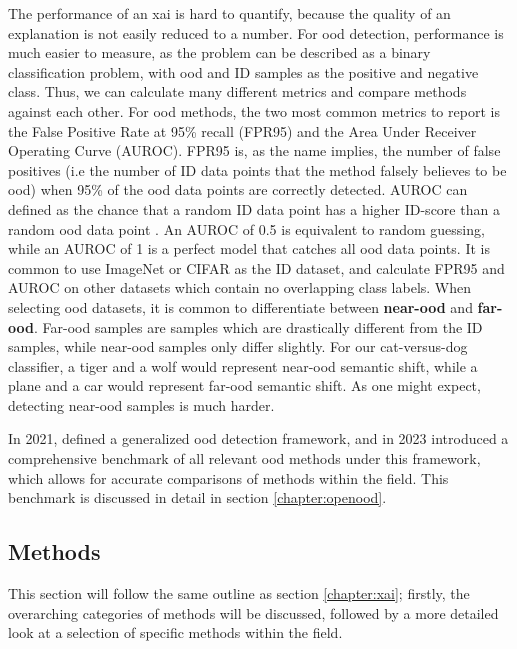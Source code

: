 \documentclass[UKenglish]{uiomasterthesis} %
\theoremstyle{definition}
\begin{document}
The performance of an \ac{xai} is hard to quantify, because the quality of an explanation is not easily reduced to a number. For \ac{ood} detection, performance is much easier to measure, as the problem can be described as a binary classification problem, with \ac{ood} and ID samples as the positive and negative class. Thus, we can calculate many different metrics and compare methods against each other. For \ac{ood} methods, the two most common metrics to report is the False Positive Rate at 95\% recall (FPR95) and the Area Under Receiver Operating Curve (AUROC). FPR95 is, as the name implies, the number of false positives (i.e the number of ID data points that the method falsely believes to be \ac{ood}) when 95\% of the \ac{ood} data points are correctly detected. AUROC can defined as the chance that a random ID data point has a higher ID-score than a random \ac{ood} data point \cite{openood}. An AUROC of 0.5 is equivalent to random guessing, while an AUROC of 1 is a perfect model that catches all \ac{ood} data points. It is common to use ImageNet or CIFAR as the ID dataset, and calculate FPR95 and AUROC on other datasets which contain no overlapping class labels. When selecting \ac{ood} datasets, it is common to differentiate between \textbf{near-\ac{ood}} and \textbf{far-\ac{ood}}. Far-\ac{ood} samples are samples which are drastically different from the ID samples, while near-\ac{ood} samples only differ slightly. For our cat-versus-dog classifier, a tiger and a wolf would represent near-\ac{ood} semantic shift, while a plane and a car would represent far-\ac{ood} semantic shift. As one might expect, detecting near-\ac{ood} samples is much harder.

In 2021, \cite{oodoverview} defined a generalized \ac{ood} detection framework, and in 2023 \cite{openood} introduced a comprehensive benchmark of all relevant \ac{ood} methods under this framework, which allows for accurate comparisons of methods within the field. This benchmark is discussed in detail in section \ref{chapter:openood}.

\subsection{Methods}

This section will follow the same outline as section \ref{chapter:xai}; firstly, the overarching categories of methods will be discussed, followed by a more detailed look at a selection of specific methods within the field.
\\
\end{document}
